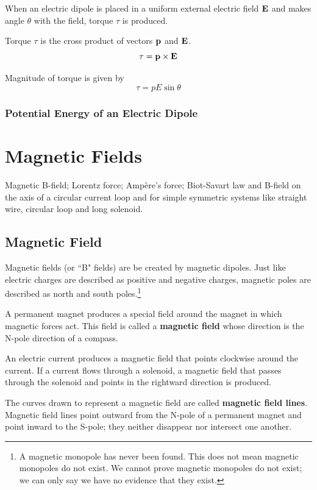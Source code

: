 When an electric dipole is placed in a uniform external electric field $\vb{E}$ and makes angle $\theta$ with the field, torque $\tau$ is produced.

Torque $\tau$ is the cross product of vectors $\vb{p}$ and $\vb{E}$.
\begin{equation}
{\tau = \vb{p} \times \vb{E}
}\end{equation}

Magnitude of torque is given by
\[ \tau = pE\sin\theta \]



\subsection{Potential Energy of an Electric Dipole}


\pagebreak

\chapter{Magnetic Fields}
Magnetic B-field; Lorentz force; Ampère’s force; Biot-Savart law and B-field on the axis of a circular current loop and for simple symmetric systems like straight wire, circular loop and long solenoid.



\section{Magnetic Field}
Magnetic fields (or ``B" fields) are be created by magnetic dipoles. Just like electric charges are described as positive and negative charges, magnetic poles are described as north and south poles.\footnote{A magnetic monopole has never been found. This does not mean magnetic monopoles do not exist. We cannot prove magnetic monopoles do not exist; we can only say we have no evidence that they exist.}

A permanent magnet produces a special field around the magnet in which magnetic forces act. This field is called a \textbf{magnetic field} whose direction is the N-pole direction of a compass. 

An electric current produces a magnetic field that points clockwise around the current. If a current flows through a solenoid, a magnetic field that passes through the solenoid and points in the rightward direction is produced. 

The curves drawn to represent a magnetic field are called \textbf{magnetic field lines}. Magnetic field lines point outward from the N-pole of a permanent magnet and point inward to the S-pole; they neither disappear nor intersect one another.

